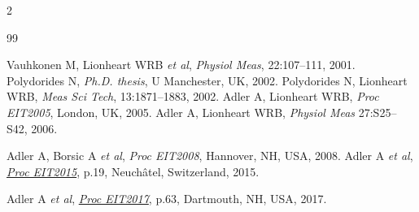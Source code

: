 \documentclass[10pt,letterpaper]{article}
\renewenvironment{thebibliography}[1]{%
    \begin{oldthebibliography}{#1}%
      \setlength{\parskip}{0ex}%
      \setlength{\itemsep}{0ex}%
  }%
  {%
    \end{oldthebibliography}%
  }
\begin{document}
\begin{multicols}{2}
\begin{thebibliography}{99}
   Vauhkonen M, Lionheart WRB {\em  et al},
   {\em  Physiol Meas}, 22:107--111, 2001.
   Polydorides N,
 {\em Ph.D. thesis}, U Manchester, UK, 2002.
   Polydorides N, Lionheart WRB,
   {\em Meas Sci Tech}, 13:1871--1883, 2002.
Adler A, Lionheart WRB,
{\em Proc EIT2005}, London, UK, 2005.
%
Adler A, Lionheart WRB,
{\em Physiol Meas} 27:S25--S42, 2006.

Adler A, Borsic A {\em et al},
{\em Proc EIT2008}, Hannover, NH, USA, 2008.
Adler A {\em et al}, %
\href{https://zenodo.org/record/17752}{\em Proc EIT2015}, p.19, 
 Neuchâtel, Switzerland, 2015.

Adler A {\em et al}, %
\href{https://zenodo.org/record/557093}{\em Proc EIT2017}, p.63, 
Dartmouth, NH, USA,  2017.
\end{thebibliography}
\end{multicols}
\end{document}
